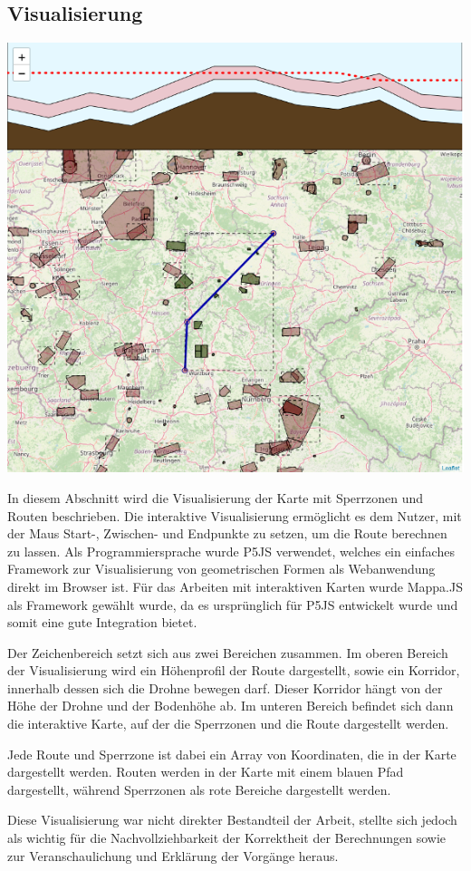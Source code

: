 \subsection*{Visualisierung}

\begin{center}
    \includegraphics[width=\columnwidth]{images/final-map-with-routing-and-height-profile}
    \label{fig:REPLACE}
\end{center}

In diesem Abschnitt wird die Visualisierung der Karte mit Sperrzonen und Routen beschrieben. Die interaktive Visualisierung ermöglicht es dem Nutzer, mit der Maus Start-, Zwischen- und Endpunkte zu setzen, um die Route berechnen zu lassen. Als Programmiersprache wurde P5JS verwendet, welches ein einfaches Framework zur Visualisierung von geometrischen Formen als Webanwendung direkt im Browser ist. Für das Arbeiten mit interaktiven Karten wurde Mappa.JS als Framework gewählt wurde, da es ursprünglich für P5JS entwickelt wurde und somit eine gute Integration bietet.

Der Zeichenbereich setzt sich aus zwei Bereichen zusammen.
Im oberen Bereich der Visualisierung wird ein Höhenprofil der Route dargestellt, sowie ein Korridor, innerhalb dessen sich die Drohne bewegen darf. Dieser Korridor hängt von der Höhe der Drohne und der Bodenhöhe ab.
Im unteren Bereich befindet sich dann die interaktive Karte, auf der die Sperrzonen und die Route dargestellt werden.

Jede Route und Sperrzone ist dabei ein Array von Koordinaten, die in der Karte dargestellt werden. Routen werden in der Karte mit einem blauen Pfad dargestellt, während Sperrzonen als rote Bereiche dargestellt werden.

Diese Visualisierung war nicht direkter Bestandteil der Arbeit,  stellte sich jedoch als wichtig für die Nachvollziehbarkeit der Korrektheit der Berechnungen sowie zur Veranschaulichung und Erklärung der Vorgänge heraus.